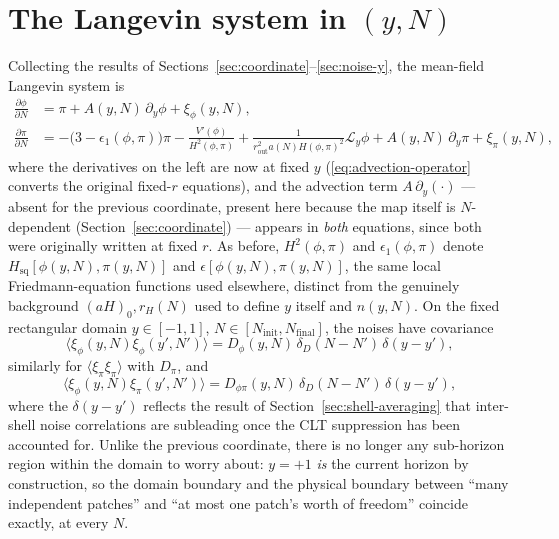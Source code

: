 \documentclass[a4paper,11pt]{article}
\newcommand{\Ny}{N}                          %
\newcommand{\Ninit}{N_{\mathrm{init}}}       %
\newcommand{\Nfinal}{N_{\mathrm{final}}}     %
\newcommand{\epsSR}{\epsilon_1}              %
\newcommand{\Hub}{H}                         %
\newcommand{\sfactor}{a}                     %
\newcommand{\atloc}{(\field,\mom)}           %
\newcommand{\field}{\phi}                    %
\newcommand{\mom}{\pi}                       %
\newcommand{\Vpot}{V}                        %
\newcommand{\noise}[1]{\xi_{#1}}             %
\newcommand{\rad}{r}                         %
\newcommand{\yco}{y}                         %
\newcommand{\rout}{\rad_{\mathrm{out}}}      %
\newcommand{\aHo}{(\sfactor \Hub)_0}         %
\newcommand{\aHloc}{\sfactor(\Ny)\Hub\atloc} %
\newcommand{\rH}{\rad_H}                     %
\newcommand{\advcoef}{A}                     %
\newcommand{\Lop}{\mathcal{L}_\yco}          %
\newcommand{\Dnoise}[1]{D_{#1}}              %
\newcommand{\ncount}{n}                      %
\begin{document}
\section{The Langevin system in $(\yco,\Ny)$}
\label{sec:langevin-y}

Collecting the results of Sections~\ref{sec:coordinate}--\ref{sec:noise-y},
the mean-field Langevin system is
\begin{subequations}
\label{eq:langevin-y}
\begin{align}
    \frac{\partial \field}{\partial \Ny}
    & =
    \mom + \advcoef(\yco,\Ny)\,\partial_\yco\field + \noise{\field}(\yco,\Ny) ,
    \\
    \frac{\partial \mom}{\partial \Ny}
    & =
    -\big(3-\epsSR\atloc\big)\mom - \frac{\Vpot'(\field)}{\Hub^2\atloc}
    + \frac{1}{\rout^2\aHloc^2} \Lop \field
    + \advcoef(\yco,\Ny)\,\partial_\yco\mom
    + \noise{\mom}(\yco,\Ny) ,
\end{align}
\end{subequations}
where the derivatives on the left are now at fixed $\yco$
(\eqref{eq:advection-operator} converts the original fixed-$\rad$ equations),
and the advection term $\advcoef\,\partial_\yco(\cdot)$ --- absent for the
previous coordinate, present here because the map itself is
$\Ny$-dependent (Section~\ref{sec:coordinate}) --- appears in \emph{both}
equations, since both were originally written at fixed $\rad$. As before,
$\Hub^2\atloc$ and $\epsSR\atloc$ denote $H_{\mathrm{sq}}[\field(\yco,\Ny),\mom(\yco,\Ny)]$
and $\epsilon[\field(\yco,\Ny),\mom(\yco,\Ny)]$, the same local
Friedmann-equation functions used elsewhere, distinct from the genuinely
background $\aHo,\rH(\Ny)$ used to define $\yco$ itself and
$\ncount(\yco,\Ny)$. On the fixed rectangular domain $\yco\in[-1,1]$,
$\Ny\in[\Ninit,\Nfinal]$, the noises have covariance
\begin{equation}
    \big\langle \noise{\field}(\yco,\Ny)\noise{\field}(\yco',\Ny')\big\rangle
    =
    \Dnoise{\field}(\yco,\Ny)\,\delta_D(\Ny-\Ny')\,\delta(\yco-\yco') ,
\end{equation}
similarly for $\big\langle\noise{\mom}\noise{\mom}\big\rangle$ with
$\Dnoise{\mom}$, and
\begin{equation}
    \big\langle \noise{\field}(\yco,\Ny)\noise{\mom}(\yco',\Ny')\big\rangle
    =
    \Dnoise{\field\mom}(\yco,\Ny)\,\delta_D(\Ny-\Ny')\,\delta(\yco-\yco') ,
    \label{eq:noise-corr}
\end{equation}
where the $\delta(\yco-\yco')$ reflects the result of
Section~\ref{sec:shell-averaging} that inter-shell noise correlations are
subleading once the CLT suppression has been accounted for. Unlike the
previous coordinate, there is no longer any sub-horizon region within the
domain to worry about: $\yco=+1$ \emph{is} the current horizon by
construction, so the domain boundary and the physical boundary between
``many independent patches'' and ``at most one patch's worth of freedom''
coincide exactly, at every $\Ny$.
\end{document}
